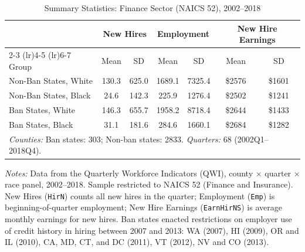 \begin{table}[htbp]
\centering
\caption{Summary Statistics: Finance Sector (NAICS 52), 2002--2018}
\label{tab:summary}
\small
\begin{tabular}{lcccccc}
\toprule
 & \multicolumn{2}{c}{New Hires} & \multicolumn{2}{c}{Employment} & \multicolumn{2}{c}{New Hire Earnings} \\
\cmidrule(lr){2-3} \cmidrule(lr){4-5} \cmidrule(lr){6-7}
Group & Mean & SD & Mean & SD & Mean & SD \\
\midrule
Non-Ban States, White & 130.3 & 625.0 & 1689.1 & 7325.4 & \$2576 & \$1601 \\
Non-Ban States, Black & 24.6 & 142.3 & 225.9 & 1276.4 & \$2502 & \$1241 \\
\addlinespace
Ban States, White & 146.3 & 655.7 & 1958.2 & 8718.4 & \$2644 & \$1433 \\
Ban States, Black & 31.1 & 181.6 & 284.6 & 1660.1 & \$2684 & \$1282 \\
\midrule
\multicolumn{7}{l}{\textit{Counties:} Ban states: 303; Non-ban states: 2833. \textit{Quarters:} 68 (2002Q1--2018Q4).} \\
\bottomrule
\end{tabular}
\begin{tablenotes}
\small
\item \textit{Notes:} Data from the Quarterly Workforce Indicators (QWI), county $\times$ quarter $\times$ race panel, 2002--2018. Sample restricted to NAICS 52 (Finance and Insurance). New Hires (\texttt{HirN}) counts all new hires in the quarter; Employment (\texttt{Emp}) is beginning-of-quarter employment; New Hire Earnings (\texttt{EarnHirNS}) is average monthly earnings for new hires. Ban states enacted restrictions on employer use of credit history in hiring between 2007 and 2013: WA (2007), HI (2009), OR and IL (2010), CA, MD, CT, and DC (2011), VT (2012), NV and CO (2013).
\end{tablenotes}
\end{table}
